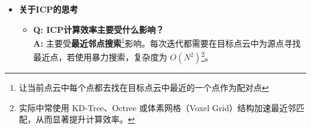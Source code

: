 \documentclass[../main.tex]{subfiles}
\begin{document}
\begin{enumerate}
\begin{itemize}
\noindent\textbf{(b) 对“零奇异值”分量：用\emph{正交补 / 左零空间}补齐 $U$}

当 $\sigma_2=0$ 时，公式 $u_2=\tfrac{1}{\sigma_2}Wv_2$ 不可用（会除以 0）。
此时从 $W$ 的\emph{左零空间}中取 $u_2$：求解
\[
W^\top u_2=0,\qquad \|u_2\|_2=1,\qquad u_2^\top u_1=0.
\]
对本例，$W^\top=\begin{bmatrix}\tfrac12&\tfrac12\\[2pt]-\tfrac12&-\tfrac12\end{bmatrix}$，
解 $W^\top u_2=0$ 可得 $u_2\propto\begin{bmatrix}-1\\[2pt]1\end{bmatrix}$，
单位化并与 $u_1$ 正交后取
\[
u_2=\tfrac{1}{\sqrt2}\!\begin{bmatrix}-1\\[2pt]1\end{bmatrix}.
\]


\medskip
\noindent\textbf{(c) 拼装 $U$}
\[
U=\begin{bmatrix}u_1 & u_2\end{bmatrix}
=\frac{1}{\sqrt2}\begin{bmatrix}
1 & -1\\[2pt]
1 & \phantom{-}1
\end{bmatrix}.
\]
（最后可检验 $U^\top U=I$ 与 $USV^\top=W$）


根据如上步骤，例题 SVD 可写为
\[
U=\frac{1}{\sqrt2}\!\begin{bmatrix}-1&-1\\-1&1\end{bmatrix},\quad
S=\mathrm{diag}(1,0),\quad
V^{\top}=\frac{1}{\sqrt2}\!\begin{bmatrix}-1&1\\[2pt]1&1\end{bmatrix},
\]
故
\[
R=VU^{\top}=
\begin{bmatrix}0&1\\[-2pt]-1&0\end{bmatrix}\ (\text{$-90^\circ$ 旋转}),\qquad
t=\bar q - R\,\bar p=(-1,\,1)^{\top}.
\]
验证：$R p_1+t=(0,1)$，$R p_2+t=(-1,0)$，与 $q_1,q_2$ 完全一致。


        \item \textbf{关于ICP的思考}
        \begin{itemize}
            \item \textbf{Q: ICP计算效率主要受什么影响？} \\
            \textbf{A:} 主要受\textbf{最近邻点搜索}\footnote{让当前点云中每个点都去找在目标点云中最近的一个点作为配对点}影响。每次迭代都需要在目标点云中为源点寻找最近点，若使用暴力搜索，复杂度为 $O(N^2)$\footnote{实际中常使用 KD-Tree、Octree 或体素网格（Voxel Grid）结构加速最近邻匹配，从而显著提升计算效率。}。


\end{itemize}
\end{itemize}
\end{enumerate}
\end{document}
